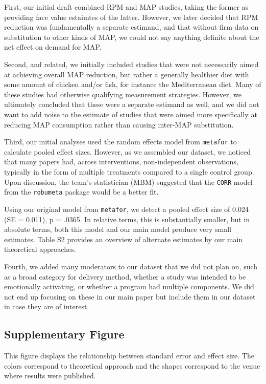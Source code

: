 \documentclass[sn-nature,pdflatex]{sn-jnl}
\begin{document}
First, our initial draft combined RPM and MAP studies, taking the former
as providing face value estaimtes of the latter. However, we later
decided that RPM reduction was fundamentally a separate estimand, and
that without firm data on substitution to other kinds of MAP, we could
not say anything definite about the net effect on demand for MAP.

Second, and related, we initially included studies that were not
necessarily aimed at achieving overall MAP reduction, but rather a
generally healthier diet with some amount of chicken and/or fish, for
instance the Mediterranean diet. Many of these studies had otherwise
qualifying measurement strategies. However, we ultimately concluded that
these were a separate estimand as well, and we did not want to add noise
to the estimate of studies that were aimed more specifically at reducing
MAP consumption rather than causing inter-MAP substitution.

Third, our initial analyses used the random effects model from
\texttt{metafor} to calculate pooled effect sizes. However, as we
assembled our dataset, we noticed that many papers had, across
interventions, non-independent observations, typically in the form of
multiple treatments compared to a single control group. Upon discussion,
the team's statistician (MBM) suggested that the \texttt{CORR} model
from the \texttt{robumeta} package would be a better fit.

Using our original model from \texttt{metafor}, we detect a pooled
effect size of 0.024 (SE = 0.011), p = .0365. In relative terms, this is
substantially smaller, but in absolute terms, both this model and our
main model produce very small estimates. Table S2 provides an overview
of alternate estimates by our main theoretical approaches.

Fourth, we added many moderators to our dataset that we did not plan on,
such as a broad category for delivery method, whether a study was
intended to be emotionally activating, or whether a program had multiple
components. We did not end up focusing on these in our main paper but
include them in our dataset in case they are of interest.

\subsection{Supplementary Figure}\label{supplementary-figure}

This figure displays the relationship between standard error and effect
size. The colors correspond to theoretical approach and the shapes
correspond to the venue where results were published.
\end{document}

